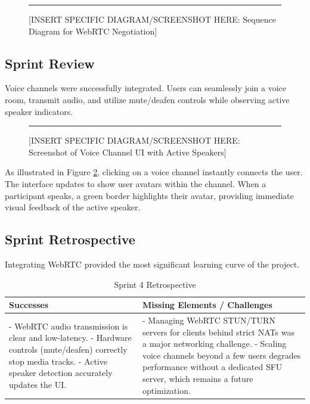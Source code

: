 \begin{figure}[h!]
    \centering
    \rule{0.8\textwidth}{5cm} %
    \caption{[INSERT SPECIFIC DIAGRAM/SCREENSHOT HERE: Sequence Diagram for WebRTC Negotiation]}
    \label{fig:sprint4_sequence}
\end{figure}

\subsection{Sprint Review}
Voice channels were successfully integrated. Users can seamlessly join a voice room, transmit audio, and utilize mute/deafen controls while observing active speaker indicators.

\begin{figure}[h!]
    \centering
    \rule{0.8\textwidth}{5cm} %
    \caption{[INSERT SPECIFIC DIAGRAM/SCREENSHOT HERE: Screenshot of Voice Channel UI with Active Speakers]}
    \label{fig:sprint4_ui}
\end{figure}

As illustrated in Figure \ref{fig:sprint4_ui}, clicking on a voice channel instantly connects the user. The interface updates to show user avatars within the channel. When a participant speaks, a green border highlights their avatar, providing immediate visual feedback of the active speaker.

\subsection{Sprint Retrospective}
Integrating WebRTC provided the most significant learning curve of the project.

\begin{table}[H]
    \centering
    \begin{tabular}{|p{7cm}|p{7cm}|}
        \hline
        \textbf{Successes} & \textbf{Missing Elements / Challenges} \\
        \hline
        - WebRTC audio transmission is clear and low-latency. \newline - Hardware controls (mute/deafen) correctly stop media tracks. \newline - Active speaker detection accurately updates the UI. & - Managing WebRTC STUN/TURN servers for clients behind strict NATs was a major networking challenge. \newline - Scaling voice channels beyond a few users degrades performance without a dedicated SFU server, which remains a future optimization. \\
        \hline
    \end{tabular}
    \caption{Sprint 4 Retrospective}
    \label{tab:sprint4_retro}
\end{table}
